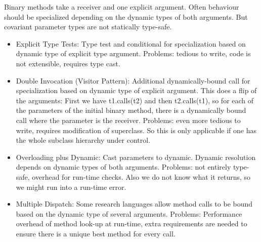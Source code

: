 \begin{mytitle} Binary methods take a receiver and one explicit argument. Often behaviour should be specialized depending on the dynamic types of both arguments. But covariant parameter types are not statically type-safe.
\begin{itemize}
    \item Explicit Type Tests: Type test and conditional for specialization based on dynamic type of explicit type argument. Problems: tedious to write, code is not extensible, requires type cast.
    \item Double Invocation (Visitor Pattern): Additional dynamically-bound call for specialization based on dynamic type of explicit argument. This does a flip of the arguments: First we have t1.calls(t2) and then t2.calls(t1), so for each of the parameters of the initial binary method, there is a dynamically bound call where the parameter is the receiver. Problems: even more tedious to write, requires modification of superclass. So this is only applicable if one has the whole subclass hierarchy under control. 
    \item Overloading plus Dynamic: Cast parameters to dynamic. Dynamic resolution depends on dynamic types of both arguments. Problems: not entirely type-safe, overhead for run-time checks. Also we do not know what it returns, so we might run into a run-time error.
    \item Multiple Dispatch: Some research languages allow method calls to be bound based on the dynamic type of several arguments. Problems: Performance overhead of method look-up at run-time, extra requirements are needed to ensure there is a unique best method for every call.
\end{itemize}
\end{mytitle}

